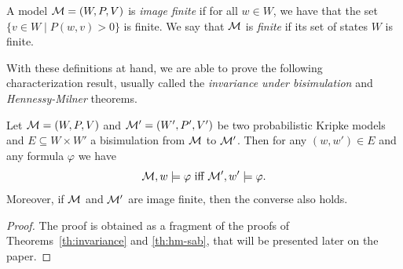 \begin{definition}
    \label{def:image-finite}
A model $\mathcal{M}=(W,P,V)$ is \emph{image finite} if for all $w\in W$, we have that the set $\{v \in W \mid P(w,v)>0\}$ is finite. We say that $\mathcal{M}$ is \emph{finite} if its set of states $W$ is finite.
\end{definition}

With these definitions at hand, we are able to prove the following characterization result, usually called the \emph{invariance under bisimulation} and \emph{Hennessy-Milner} theorems.

\begin{theorem}\label{th:inv_prob} Let  $\mathcal{M}=(W,P, V)$ and $\mathcal{M}' = (W', P', V')$ be two probabilistic Kripke models and $E \subseteq W \times W'$ a bisimulation from $\mathcal{M}$ to $\mathcal{M}'$. Then for any $(w,w')\in E$ and any formula $\varphi$ we have  
\[  
    \mathcal{M},w \models \varphi \text{ iff } \mathcal{M}',w' \models \varphi.
\]
Moreover, if $\mathcal{M}$ and $\mathcal{M}'$ are image finite, then the converse also holds.
\end{theorem}

\begin{proof}
    The proof is obtained as a fragment of the proofs of Theorems~\ref{th:invariance} and \ref{th:hm-sab}, that will be presented later on the paper.
\end{proof}
